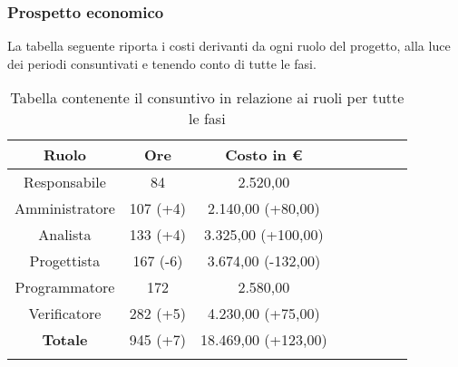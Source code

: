 \subsubsection{Prospetto economico}

La tabella seguente riporta i costi derivanti da ogni ruolo del progetto, alla luce dei periodi consuntivati e tenendo conto di tutte le fasi.

\begin{longtable}{|c|c|c|c|c|c|c|c|}
	\hline
	\rowcolor{lighter-grayer}
	\textbf{Ruolo}  & \textbf{Ore} & \textbf{Costo in €} \\
	\hline
	\endfirsthead

	\hline
	Responsabile    & 84           & 2.520,00            \\
	\hline
	\hline
	Amministratore  & 107 (+4)          & 2.140,00 (+80,00)           \\
	\hline
	\hline
	Analista        & 133 (+4)         & 3.325,00 (+100,00)           \\
	\hline
	\hline
	Progettista     & 167 (-6)         & 3.674,00 (-132,00)           \\
	\hline
	\hline
	Programmatore   & 172          & 2.580,00            \\
	\hline
	\hline
	Verificatore    & 282 (+5)         & 4.230,00 (+75,00)           \\
	\hline
	\hline
	\textbf{Totale} & 945 (+7)         & 18.469,00 (+123,00)          \\
	\hline
	\rowcolor{white}
	\caption{Tabella contenente il consuntivo in relazione ai ruoli per tutte le fasi}
\end{longtable}



